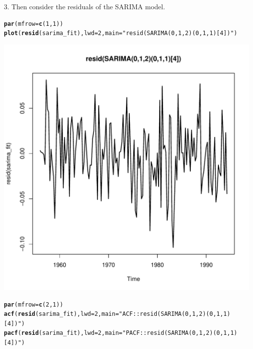 \documentclass[10pt]{article}\usepackage[]{graphicx}\usepackage[]{color}
\makeatletter
\def\maxwidth{ %
  \ifdim\Gin@nat@width>\linewidth
    \linewidth
  \else
    \Gin@nat@width
  \fi
}
\newcommand{\hlnum}[1]{\textcolor[rgb]{0.686,0.059,0.569}{#1}}%
\newcommand{\hlstr}[1]{\textcolor[rgb]{0.192,0.494,0.8}{#1}}%
\newcommand{\hlstd}[1]{\textcolor[rgb]{0.345,0.345,0.345}{#1}}%
\newcommand{\hlkwc}[1]{\textcolor[rgb]{0.333,0.667,0.333}{#1}}%
\newcommand{\hlkwd}[1]{\textcolor[rgb]{0.737,0.353,0.396}{\textbf{#1}}}%
\newenvironment{kframe}{%
 \def\at@end@of@kframe{}%
 \ifinner\ifhmode%
  \def\at@end@of@kframe{\end{minipage}}%
  \begin{minipage}{\columnwidth}%
 \fi\fi%
 \def\FrameCommand##1{\hskip\@totalleftmargin \hskip-\fboxsep
 \colorbox{shadecolor}{##1}\hskip-\fboxsep
     \hskip-\linewidth \hskip-\@totalleftmargin \hskip\columnwidth}%
 \MakeFramed {\advance\hsize-\width
   \@totalleftmargin\z@ \linewidth\hsize
   \@setminipage}}%
 {\par\unskip\endMakeFramed%
 \at@end@of@kframe}
\newenvironment{knitrout}{}{} %
\makeatother
\begin{document}
3. Then consider the residuals of the SARIMA model.
\begin{knitrout}
\color{fgcolor}\begin{kframe}
\begin{alltt}
\hlkwd{par}\hlstd{(}\hlkwc{mfrow}\hlstd{=}\hlkwd{c}\hlstd{(}\hlnum{1}\hlstd{,}\hlnum{1}\hlstd{))}
\hlkwd{plot}\hlstd{(}\hlkwd{resid}\hlstd{(sarima_fit),}\hlkwc{lwd}\hlstd{=}\hlnum{2}\hlstd{,} \hlkwc{main}\hlstd{=}\hlstr{"resid(SARIMA(0,1,2)(0,1,1)[4])"}\hlstd{)}
\end{alltt}
\end{kframe}
\includegraphics[width=\maxwidth]{figure/unnamed-chunk-20-1} 
\begin{kframe}\begin{alltt}
\hlkwd{par}\hlstd{(}\hlkwc{mfrow}\hlstd{=}\hlkwd{c}\hlstd{(}\hlnum{2}\hlstd{,}\hlnum{1}\hlstd{))}
\hlkwd{acf}\hlstd{(}\hlkwd{resid}\hlstd{(sarima_fit),}\hlkwc{lwd}\hlstd{=}\hlnum{2}\hlstd{,} \hlkwc{main}\hlstd{=}\hlstr{"ACF::resid(SARIMA(0,1,2)(0,1,1)[4])"}\hlstd{)}
\hlkwd{pacf}\hlstd{(}\hlkwd{resid}\hlstd{(sarima_fit),}\hlkwc{lwd}\hlstd{=}\hlnum{2}\hlstd{,} \hlkwc{main}\hlstd{=}\hlstr{"PACF::resid(SARIMA(0,1,2)(0,1,1)[4])"}\hlstd{)}
\end{alltt}
\end{kframe}

\end{knitrout}
\end{document}
